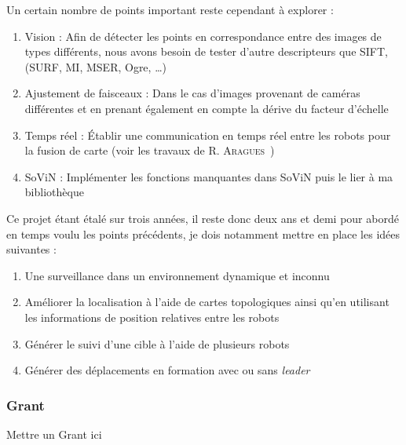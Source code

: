 Un certain nombre de points important reste cependant à explorer :
\begin{enumerate}
\item Vision : Afin de détecter les points en correspondance entre des images de types différents, nous avons besoin de tester d'autre descripteurs que SIFT, (SURF, MI, MSER, Ogre, \dots)
\item Ajustement de faisceaux : Dans le cas d'images provenant de caméras différentes et en prenant également en compte la dérive du facteur d'échelle
\item Temps réel : Établir une communication en temps réel entre les robots pour la fusion de carte (voir les travaux de R. \textsc{Aragues}~\cite{Aragues11PhD})
\item SoViN : Implémenter les fonctions manquantes dans SoViN puis le lier à ma bibliothèque 
\end{enumerate}

Ce projet étant étalé sur trois années, il reste donc deux ans et demi pour abordé en temps voulu les points précédents, je dois notamment mettre en place les idées suivantes :
\begin{enumerate}
\item Une surveillance dans un environnement dynamique et inconnu
\item Améliorer la localisation à l'aide de cartes topologiques ainsi qu'en utilisant les informations de position relatives entre les robots
\item Générer le suivi d'une cible à l'aide de plusieurs robots
\item Générer des déplacements en formation avec ou sans \emph{leader}
\end{enumerate}

\subsubsection{Grant}

Mettre un Grant ici \dag